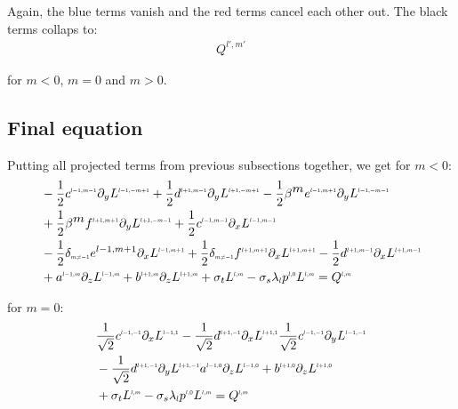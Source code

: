 \documentclass[10pt]{scrartcl}
\begin{document}
Again, the blue terms vanish and the red terms cancel each other out. The black terms collaps to:
\begin{align*}
Q^{l',m'}
\end{align*}

for $m<0$, $m=0$ and $m>0$.

\subsection{Final equation}

Putting all projected terms from previous subsections together, we get for $m<0$:
\begin{align}
&-\frac{1}{2}c^{\scaleto{l-1,m-1}{4pt}}
\partial_y
L^{\scaleto{l-1,-m+1}{4pt}}
+\frac{1}{2}d^{\scaleto{l+1,m-1}{4pt}}
\partial_y
L^{\scaleto{l+1,-m+1}{4pt}}
-\frac{1}{2}\beta^{\scaleto{m}{4pt}}e^{\scaleto{l-1,m+1}{4pt}}
\partial_y
L^{\scaleto{l-1,-m-1}{4pt}}
\nonumber
\\&
+\frac{1}{2}\beta^{\scaleto{m}{4pt}}f^{\scaleto{l+1,m+1}{4pt}}
\partial_y
L^{\scaleto{l+1,-m-1}{4pt}}
+\frac{1}{2}c^{\scaleto{l-1,m-1}{4pt}}
\partial_x
L^{\scaleto{l-1,m-1}{4pt}}
\nonumber
\\&
-\frac{1}{2}\delta_{\scaleto{m\neq -1}{4pt}}e^{{l-1,m+1}}
\partial_x
L^{\scaleto{l-1,m+1}{4pt}}
+\frac{1}{2}\delta_{\scaleto{m\neq -1}{4pt}}f^{\scaleto{l+1,m+1}{4pt}}
\partial_x
L^{\scaleto{l+1,m+1}{4pt}}
-\frac{1}{2}d^{\scaleto{l+1,m-1}{4pt}}
\partial_x
L^{\scaleto{l+1,m-1}{4pt}}
\nonumber
\\&
+a^{\scaleto{l-1,m}{4pt}}
\partial_z
L^{\scaleto{l-1,m}{4pt}}
+b^{\scaleto{l+1,m}{4pt}}
\partial_z
L^{\scaleto{l+1,m}{4pt}}
+\sigma_t L^{\scaleto{l,m}{4pt}}
-\sigma_s\lambda_{\scaleto{l}{4pt}}p^{\scaleto{l,0}{4pt}}L^{\scaleto{l,m}{4pt}}
= Q^{\scaleto{l,m}{4pt}}
\end{align}

for $m=0$:
\begin{align}
&
\frac{1}{\sqrt{2}}c^{\scaleto{l-1,-1}{4pt}}\partial_x L^{\scaleto{l-1,1}{4pt}}
-\frac{1}{\sqrt{2}}d^{\scaleto{l+1,-1}{4pt}}\partial_x L^{\scaleto{l+1,1}{4pt}}
\frac{1}{\sqrt{2}}c^{\scaleto{l-1,-1}{4pt}}\partial_y L^{\scaleto{l-1,-1}{4pt}}
\nonumber
\\&
-\frac{1}{\sqrt{2}}d^{\scaleto{l+1,-1}{4pt}}\partial_y L^{\scaleto{l+1,-1}{4pt}}
a^{\scaleto{l-1,0}{4pt}}\partial_z L^{\scaleto{l-1,0}{4pt}}
+b^{\scaleto{l+1,0}{4pt}}\partial_z L^{\scaleto{l+1,0}{4pt}}
\nonumber
\\&
+\sigma_t L^{\scaleto{l,m}{4pt}}
-\sigma_s\lambda_{\scaleto{l}{4pt}}p^{\scaleto{l,0}{4pt}}L^{\scaleto{l,m}{4pt}}
= Q^{\scaleto{l,m}{4pt}}
\end{align}
\end{document}
